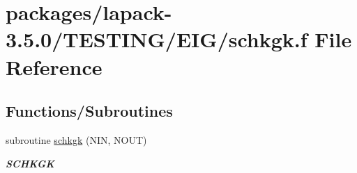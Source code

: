 \hypertarget{schkgk_8f}{}\section{packages/lapack-\/3.5.0/\+T\+E\+S\+T\+I\+N\+G/\+E\+I\+G/schkgk.f File Reference}
\label{schkgk_8f}
\subsection*{Functions/\+Subroutines}
\begin{DoxyCompactItemize}
\item 
subroutine \hyperlink{group__single__eig_ga30cf9f83367d540b803fbd2b264dde8f}{schkgk} (N\+I\+N, N\+O\+U\+T)
\begin{DoxyCompactList}\small\item\em {\bfseries S\+C\+H\+K\+G\+K} \end{DoxyCompactList}\end{DoxyCompactItemize}
